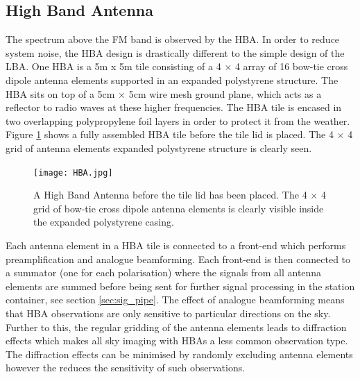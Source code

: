\subsection{High Band Antenna}
The spectrum above the FM band is observed by the HBA. In order to reduce system noise, the HBA design is drastically different to the simple design of the LBA. One HBA is a 5m x 5m tile consisting of a 4 $\times$ 4 array of 16 bow-tie cross dipole antenna elements supported in an expanded polystyrene structure. The HBA sits on top of a 5cm $\times$ 5cm wire mesh ground plane, which acts as a reflector to radio waves at these higher frequencies. The HBA tile is encased in two overlapping polypropylene foil layers in order to protect it from the weather. Figure \ref{fig:HBA} shows a fully assembled HBA tile before the tile lid is placed. The 4 $\times$ 4 grid of antenna elements expanded polystyrene structure is clearly seen.

\begin{figure}[ht]
\centering
\texttt{[image: HBA.jpg]}
\caption[The inside of a High Band Antenna tile.]{A High Band Antenna before the tile lid has been placed. The  4 $\times$ 4 grid of bow-tie cross dipole antenna elements is clearly visible inside the expanded polystyrene casing.}
\label{fig:HBA}
\end{figure}

Each antenna element in a HBA tile is connected to a front-end which performs preamplification and analogue beamforming. Each front-end is then connected to a summator (one for each polarisation) where the signals from all antenna elements are summed before being sent for further signal processing in the station container, see section \ref{sec:sig_pipe}. The effect of analogue beamforming means that HBA observations are only sensitive to particular directions on the sky. Further to this, the regular gridding of the antenna elements leads to diffraction effects which makes all sky imaging with HBAs a less common observation type. The diffraction effects can be minimised by randomly excluding antenna elements however the reduces the sensitivity of such observations.

